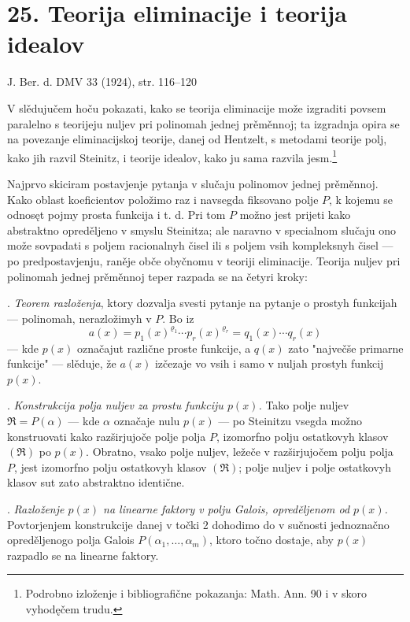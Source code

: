 \documentclass[11pt]{article}
\providecommand{\frakR}{\mathfrak R}
\begin{document}
\setcounter{footnote}{0}

\section*{25. Teorija eliminacije i teorija idealov}

\begin{center}
J. Ber. d. DMV 33 (1924), str. 116--120
\end{center}

V slědujučem hoču pokazati, kako se teorija eliminacije može izgraditi povsem paralelno s teorijeju nuljev pri polinomah jednej prěměnnoj; ta izgradnja opira se na povezanje eliminacijskoj teorije, danej od Hentzelt, s metodami teorije polj, kako jih razvil Steinitz, i teorije idealov, kako ju sama razvila jesm.\footnote{Podrobno izloženje i bibliografične pokazanja: Math. Ann. 90 i v skoro vyhodęčem trudu.}

Najprvo skiciram postavjenje pytanja v slučaju polinomov jednej prěměnnoj. Kako oblast koeficientov položimo raz i navsegda fiksovano polje $P$, k kojemu se odnosęt pojmy prosta funkcija i t. d. Pri tom $P$ možno jest prijeti kako abstraktno opreděljeno v smyslu Steinitza; ale naravno v specialnom slučaju ono može sovpadati s poljem racionalnyh čisel ili s poljem vsih kompleksnyh čisel --- po predpostavjenju, raněje obče obyčnomu v teoriji eliminacije. Teorija nuljev pri polinomah jednej prěměnnoj teper razpada se na četyri kroky:

. \emph{Teorem razloženja}, ktory dozvalja svesti pytanje na pytanje o prostyh funkcijah --- polinomah, nerazložimyh v $P$. Bo iz
\[
 a(x)=p_1(x)^{\varrho_1}\cdots p_r(x)^{\varrho_r}=q_1(x)\cdots q_r(x)
\]
--- kde $p(x)$ označajut različne proste funkcije, a $q(x)$ zato "največše primarne funkcije" --- slěduje, že $a(x)$ izčezaje vo vsih i samo v nuljah prostyh funkcij $p(x)$.

. \emph{Konstrukcija polja nuljev za prostu funkciju $p(x)$.} Tako polje nuljev $\frakR=P(\alpha)$ --- kde $\alpha$ označaje nulu $p(x)$ --- po Steinitzu vsegda možno konstruovati kako razširjujoče polje polja $P$, izomorfno polju ostatkovyh klasov $(\frakR)$ po $p(x)$. Obratno, vsako polje nuljev, ležeče v razširjujočem polju polja $P$, jest izomorfno polju ostatkovyh klasov $(\frakR)$; polje nuljev i polje ostatkovyh klasov sut zato abstraktno identične.

. \emph{Razloženje $p(x)$ na linearne faktory v polju Galois, opreděljenom od $p(x)$.} Povtorjenjem konstrukcije danej v točki 2 dohodimo do v sučnosti jednoznačno opreděljenogo polja Galois $P(\alpha_1,\ldots,\alpha_m)$, ktoro točno dostaje, aby $p(x)$ razpadlo se na linearne faktory.
\end{document}

